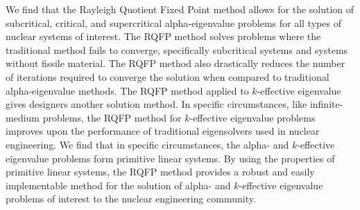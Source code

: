 We find that the Rayleigh Quotient Fixed Point method allows for the solution of subcritical, critical, and supercritical alpha-eigenvalue problems for all types of nuclear systems of interest. The RQFP method solves problems where the traditional method fails to converge, specifically subcritical systems and systems without fissile material. The RQFP method also drastically reduces the number of iterations required to converge the solution when compared to traditional alpha-eigenvalue methods. The RQFP method applied to $k$-effective eigenvalue gives designers another solution method. In specific circumstances, like infinite-medium problems, the RQFP method for $k$-effective eigenvalue problems improves upon the performance of traditional eigensolvers used in nuclear engineering. We find that in specific circumstances, the alpha- and $k$-effective eigenvalue problems form primitive linear systems. By using the properties of primitive linear systems, the RQFP method provides a robust and easily implementable method for the solution of alpha- and $k$-effective eigenvalue problems of interest to the nuclear engineering community.